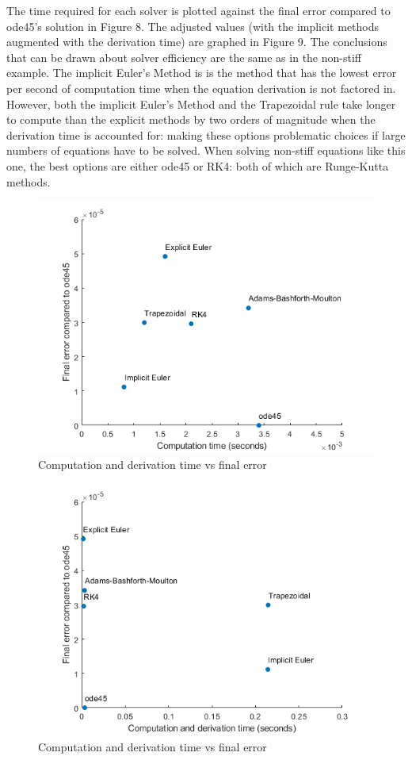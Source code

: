 \documentclass[11pt]{article}
\begin{document}
The time required for each solver is plotted against the final error compared to 
ode45's solution in Figure 8. The adjusted values (with the implicit methods 
augmented with the derivation time) are graphed in Figure 9. The conclusions that
can be drawn about solver efficiency are the same as in the non-stiff example. 
The implicit Euler's Method is is the method 
that has the lowest error per second of computation time when the equation
derivation is not factored in. However, both the implicit Euler's Method and 
the Trapezoidal rule take longer to compute than the explicit methods by two orders
of magnitude when the derivation time is accounted for: making these options
problematic choices if large numbers of equations have to be solved. When solving
non-stiff equations like this one, the best options are either ode45 or RK4: both
of which are Runge-Kutta methods.

\begin{figure} [!h]
\centering
        \includegraphics[totalheight=8cm]{error3.png}
    \caption{Computation and derivation time vs final error}
    \label{figure8}
\end{figure}

\begin{figure} [!h]
\centering
        \includegraphics[totalheight=8cm]{error4.png}
    \caption{Computation and derivation time vs final error}
    \label{figure9}
\end{figure}
\end{document}
